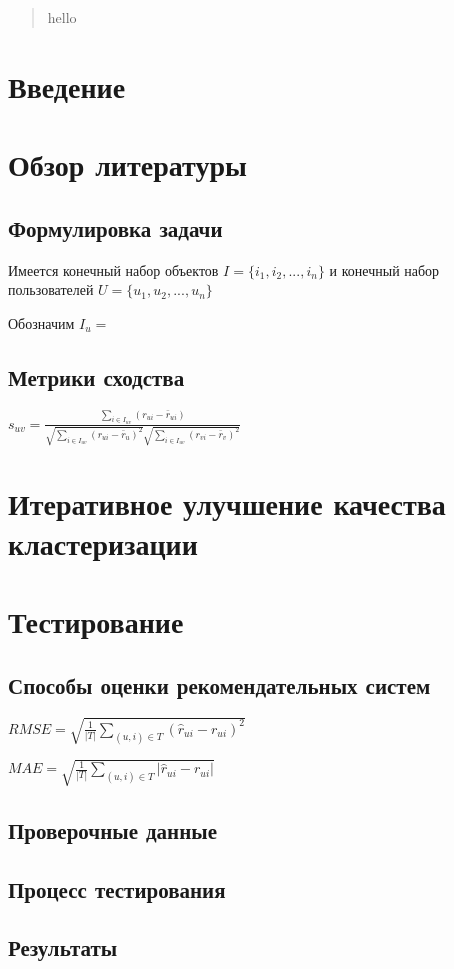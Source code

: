 \documentclass[12pt]{article} %
\begin{document}
\begin{abstract}
hello
\end{abstract}

\section{Введение}
\par

\section{Обзор литературы}
\subsection{Формулировка задачи}
\par
Имеется конечный набор объектов $I=\{i_{1}, i_{2}, ..., i_{n}\}$ и конечный набор пользователей $U=\{u_{1}, u_{2}, ..., u_{n}\}$

\par
Обозначим $I_{u}= $

\subsection{Метрики сходства}

$s_{uv} = \frac{\sum_{i \in I_{uv}} (r_{ui} - \bar{r}_{ui})}{\sqrt{\sum_{i \in I_{uv}}  (r_{ui} - \bar{r}_{u})^2} \sqrt{\sum_{i \in I_{uv}}  (r_{vi} - \bar{r}_{v})^2}}$




\section{Итеративное улучшение качества кластеризации}

\section{Тестирование}
\subsection{Способы оценки рекомендательных систем}

$RMSE=\sqrt{\frac{1}{|T|}\sum_{(u,i)\in T} (\hat{r}_{ui} - r_{ui})^2}$

$MAE=\sqrt{\frac{1}{|T|}\sum_{(u,i)\in T} |\hat{r}_{ui} - r_{ui}|}$

\subsection{Проверочные данные}


\subsection{Процесс тестирования}

\subsection{Результаты}
\end{document}
